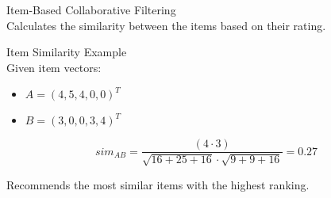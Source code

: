 \begin{concept}{Item-Based Collaborative Filtering}\\
Calculates the similarity between the items based on their rating.
\end{concept}

\begin{example2}{Item Similarity Example}\\
Given item vectors:
\begin{itemize}
    \item $A = (4, 5, 4, 0, 0)^T$
    \item $B = (3, 0, 0, 3, 4)^T$
\end{itemize}

$$sim_{AB} = \frac{(4 \cdot 3)}{\sqrt{16 + 25 + 16} \cdot \sqrt{9 + 9 + 16}} = 0.27$$

Recommends the most similar items with the highest ranking.
\end{example2}

